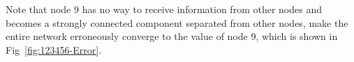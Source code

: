 \documentclass[conference]{IEEEtran}
\begin{document}

Note that node 9 has no way to receive information from other nodes and becomes a strongly connected component separated from other nodes, make the entire network erroneously converge to the value of node 9, which is shown in Fig~\ref{fig:123456-Error}.
\end{document}
